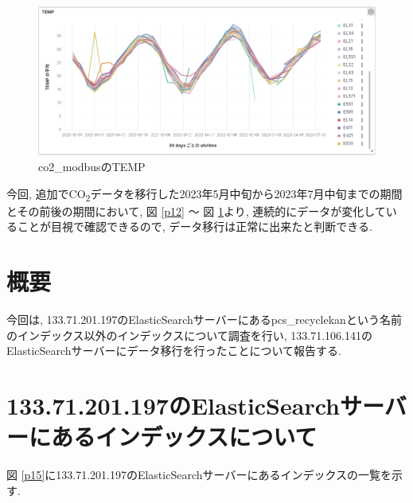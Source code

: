 \begin{figure}[!ht]
    \begin{center}
        \includegraphics[width=160mm]{sotu/figure/temp.png}
        \caption{co2\_modbusのTEMP}
        \label{p14}
    \end{center}
\end{figure}

今回, 追加でCO\textsubscript{2}データを移行した2023年5月中旬から2023年7月中旬までの期間とその前後の期間において, 図 \ref{p12} 〜 図 \ref{p14}より, 連続的にデータが変化していることが目視で確認できるので, データ移行は正常に出来たと判断できる.


\section{概要}
今回は, 133.71.201.197のElasticSearchサーバーにあるpcs\_recyclekanという名前のインデックス以外のインデックスについて調査を行い, 133.71.106.141のElasticSearchサーバーにデータ移行を行ったことについて報告する.

\section{133.71.201.197のElasticSearchサーバーにあるインデックスについて}
図 \ref{p15}に133.71.201.197のElasticSearchサーバーにあるインデックスの一覧を示す.

